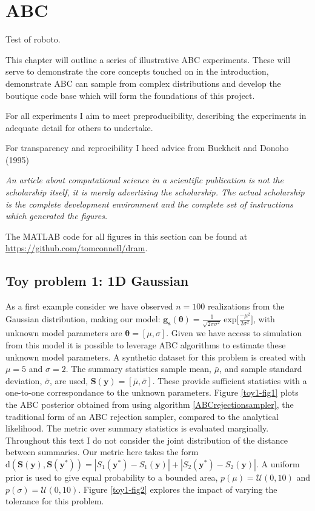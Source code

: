 \chapter{ABC}

{\sffamily Test of roboto.}

This chapter will outline a series of illustrative ABC experiments. These will serve to demonstrate the core concepts touched on in the introduction, demonstrate ABC can sample from complex distributions and develop the boutique code base which will form the foundations of this project.

For all experiments I aim to meet preproducibility, describing the experiments in adequate detail for others to undertake. 

For transparency and reprocibility I heed advice from Buckheit and Donoho (1995)
\begin{displayquote}
\textit{An article about computational science in a scientific publication is not the scholarship itself, it is merely advertising the scholarship. The actual scholarship is the complete development environment and the complete set of instructions which generated the figures.}
\end{displayquote}
The MATLAB code for all figures in this section can be found at \url{https://github.com/tomconnell/dram}.

\section{Toy problem 1: 1D Gaussian}
As a first example consider we have observed $n = 100$ realizations from the Gaussian distribution, making our model: $\bm{g_s}(\bm{\theta}) = \frac{1}{\sqrt{2\pi\sigma^2}}\ \text{exp}\Big[\frac{-\mu^2}{2\sigma^2}\Big]$, with unknown model parameters are $\bm{\theta} = [\mu,\sigma]$. Given we have access to simulation from this model it is possible to leverage ABC algorithms to estimate these unknown model parameters. A synthetic dataset for this problem is created with $\mu = 5$ and $\sigma = 2$. The summary statistics sample mean, $\bar{\mu}$, and sample standard deviation, $\bar{\sigma}$, are used, $\bm{S}(\bm{y}) = [\bar{\mu},\bar{\sigma}]$. These provide sufficient statistics with a one-to-one correspondance to the unknown parameters. Figure \ref{toy1-fig1} plots the ABC posterior obtained from using algorithm \ref{ABCrejectionsampler}, the traditional form of an ABC rejection sampler, compared to the analytical likelihood. The metric over summary statistics is evaluated marginally. Throughout this text I do not consider the joint distribution of the distance between summaries. Our metric here takes the form $\text{d}(\bm{S}(\bm{y}),\bm{S}(\bm{y^*})) = |S_1(\bm{y^*}) - S_1(\bm{y})| +| S_2(\bm{y^*}) - S_2(\bm{y})|$. A uniform prior is used to give equal probability to a bounded area, $p(\mu) = \mathcal{U}(0,10)$ and $p(\sigma) = \mathcal{U}(0,10)$. 
Figure \ref{toy1-fig2} explores the impact of varying the tolerance for this problem.\\

